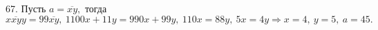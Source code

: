 67. Пусть $a=\overline{xy},$ тогда $\overline{xxyy}=99\overline{xy},\ 1100x+11y=990x+99y,\ 110x=88y,\ 5x=4y\Rightarrow x=4,\ y=5,\ a=45.$\\
